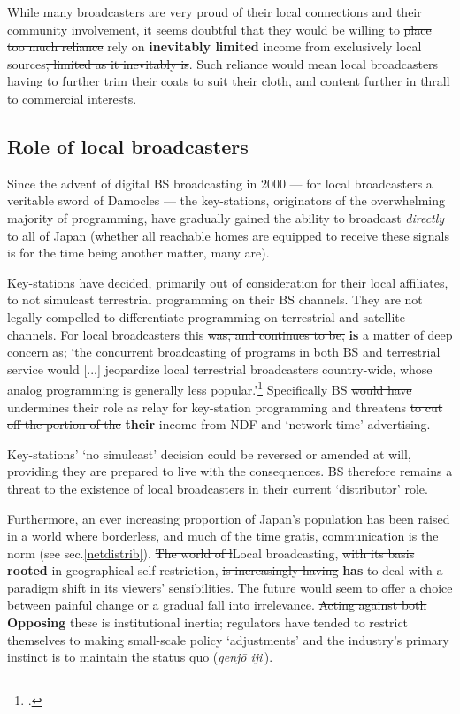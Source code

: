 \documentclass[11pt, oneside, a4paper, headsepline]{scrartcl}
\newcommand{\citej}[2] {\footcite[\nopp #1]{#2} }
\newcommand{\cjk}[1]{{\fontspec[Scale=0.9]{Hiragino Mincho Pro}#1}}
\begin{document}
While many broadcasters are very proud of their local connections and their community involvement, it seems doubtful that they would be willing to \st{place too much reliance} rely on \textbf{inevitably limited} income from exclusively local sources\st{, limited as it inevitably is}. Such reliance would mean local broadcasters having to further trim their coats to suit their cloth, and content further in thrall to commercial interests.

\subsection{Role of local broadcasters}
Since the advent of digital BS broadcasting in 2000 --- for local broadcasters a veritable sword of Damocles --- the key-stations, originators of the overwhelming majority of programming, have gradually gained the ability to broadcast \emph{directly} to all of Japan (whether all reachable homes are equipped to receive these signals is for the time being another matter, many are). 

Key-stations have decided, primarily out of consideration for their local affiliates, to not simulcast terrestrial programming on their BS channels. They are not legally compelled to differentiate programming on terrestrial and satellite channels. For local broadcasters this \st{was, and continues to be,} \textbf{is} a matter of deep concern as; `the concurrent broadcasting of programs in both BS and terrestrial service would [...] jeopardize local terrestrial broadcasters country-wide, whose analog programming is generally less popular.'\citej{70}{Kwak:2008} Specifically BS \st{would have} undermines their role as relay for key-station programming and threatens \st{to cut off the portion of the} \textbf{their} income from NDF and `network time' advertising.

Key-stations' `no simulcast' decision could be reversed or amended at will, providing they are prepared to live with the consequences. BS therefore remains a threat to the existence of local broadcasters in their current `distributor' role. 

\bigskip

Furthermore, an ever increasing proportion of Japan's population has been raised in a world where borderless, and much of the time gratis, communication is the norm (see sec.\ref{netdistrib}). \st{The world of l}Local broadcasting, \st{with its basis} \textbf{rooted} in geographical self-restriction, \st{is increasingly having} \textbf{has} to deal with a paradigm shift in its viewers' sensibilities. The future would seem to offer a choice between painful change or a gradual fall into irrelevance. \st{Acting against both} \textbf{Opposing} these is institutional inertia; regulators have tended to restrict themselves to making small-scale policy `adjustments' and the industry's primary instinct is to maintain the status quo (\emph{genj\={o} iji}\,).%
\end{document}
